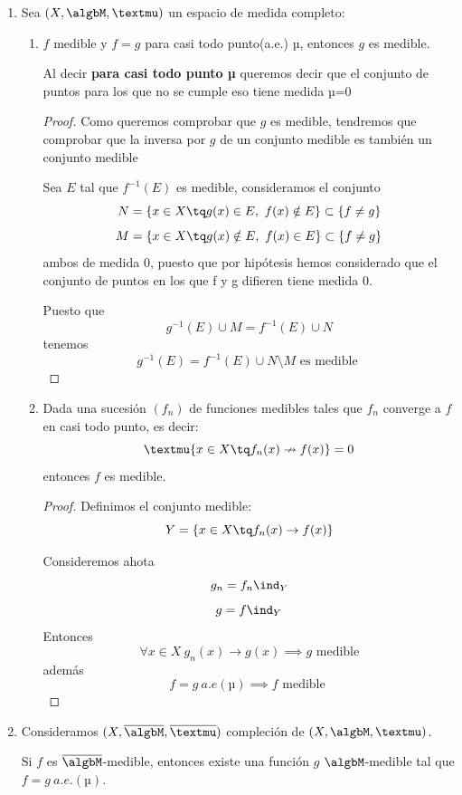 \documentclass{apuntes}
\begin{document}
\begin{enumerate}
\begin{enumerate}
\begin{proof}
Además,
\[\lim \varphi_n (x)= f(x)\]
\[|\varphi_n|^2 = |\Psi_n|^2+|\varsigma_n|^2\]

\end{proof}
\end{enumerate}

\item Sea $(X, \algbM, µ)$ un espacio de medida completo:
\begin{enumerate}
\item $f$ medible y $f=g$ para casi todo punto(a.e.) µ, entonces $g$ es medible.

Al decir \textbf{para casi todo punto µ} queremos decir que el conjunto de puntos para los que no se cumple eso tiene medida µ=0
\begin{proof}
Como queremos comprobar que $g$ es medible, tendremos que comprobar que la inversa por $g$ de un conjunto medible es también un conjunto medible

Sea $E$ tal que $f^{-1}(E)$ es medible, consideramos el conjunto
\[N= \{x \in X \tq g(x)\in E, \ f(x) \notin E\}\subset \{f \neq g\}\]
\[M= \{x \in X \tq g(x)\notin E, \ f(x) \in E\}\subset \{f \neq g\}\]
ambos de medida 0, puesto que por hipótesis hemos considerado que el conjunto de puntos en los que f y g difieren tiene medida 0.

Puesto que
\[g^{-1}(E) \cup M = f^{-1}(E)\cup N\]
tenemos
\[g^{-1}(E) = f^{-1}(E)\cup N \setminus M \text{ es medible }\]
\end{proof}

\newpage
\item Dada una sucesión $(f_n)$ de funciones medibles tales que $f_n$ converge a $f$ en casi todo punto, es decir:
\[µ\{x \in X \tq f_n(x) \nrightarrow f(x)\} = 0\]
entonces $f$ es medible.

\begin{proof}
Definimos el conjunto medible:
\[Y=\{x \in X \tq f_n(x)\rightarrow f(x)\}\]

Consideremos ahota
\[g_n = f_n \ind_Y\]
\[g = f \ind_Y\]
Entonces
\[\forall x \in X \ g_n(x) \rightarrow g(x) \implies g \text{ medible}\]
además
\[f=g \ a.e(µ) \implies f \text{ medible }\]
\end{proof}
\end{enumerate}

\item Consideramos $(X, \overline{\algbM}, \overline{µ})$ compleción de $(X, \algbM, µ)$.

Si $f$ es $\overline{\algbM}$-medible, entonces existe una función $g$ $\algbM$-medible tal que $f=g \ a.e.(µ)$.


\end{enumerate}
\end{document}
